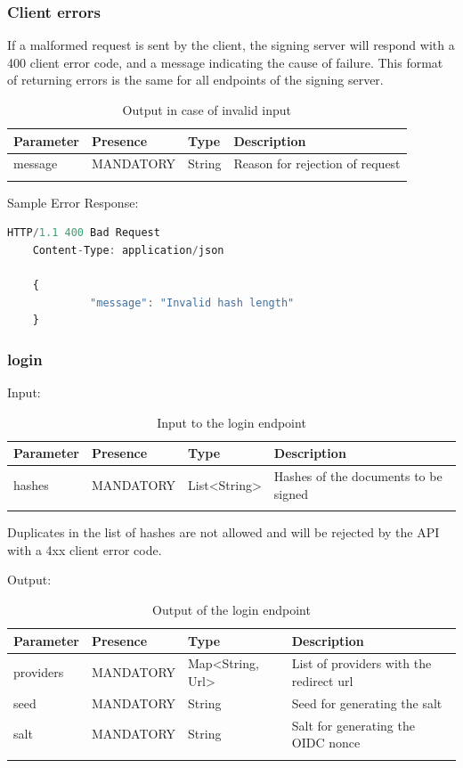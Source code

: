 \subsubsection{Client errors}
If a malformed request is sent by the client, the signing server will respond with a 400 client error code,
and a message indicating the cause of failure.
This format of returning errors is the same for all endpoints of the signing server.

\begin{longtable}{|l|l|l|l|}
	\hline
	\textbf{Parameter} & \textbf{Presence} & \textbf{Type} & \textbf{Description} \\ \hline
    message & MANDATORY & String & Reason for rejection of request \\ \hline
	\caption{Output in case of invalid input}
\end{longtable}

Sample Error Response:
\begin{lstlisting}[caption={Error response}, captionpos=b, language=JavaScript, label={lst:hashesresponse}]
	HTTP/1.1 400 Bad Request
	Content-Type: application/json

	{
             "message": "Invalid hash length"
	}
\end{lstlisting}

\subsubsection{login}
Input:

\begin{longtable}{|l|l|l|l|}
	\hline
	\textbf{Parameter} & \textbf{Presence} & \textbf{Type} & \textbf{Description} \\ \hline
	hashes & MANDATORY & List<String> & Hashes of the documents to be signed \\ \hline
    \caption{Input to the login endpoint}
\end{longtable}

Duplicates in the list of hashes are not allowed and will be rejected by the API with a 4xx client error code.

Output:

\begin{longtable}{|l|l|l|l|}
	\hline
	\textbf{Parameter} & \textbf{Presence} & \textbf{Type} & \textbf{Description} \\ \hline
	providers & MANDATORY & Map<String, Url> & List of providers with the redirect url \\ \hline
	seed & MANDATORY & String & Seed for generating the salt \\ \hline
	salt & MANDATORY & String & Salt for generating the OIDC nonce \\ \hline
	\caption{Output of the login endpoint}
\end{longtable}

